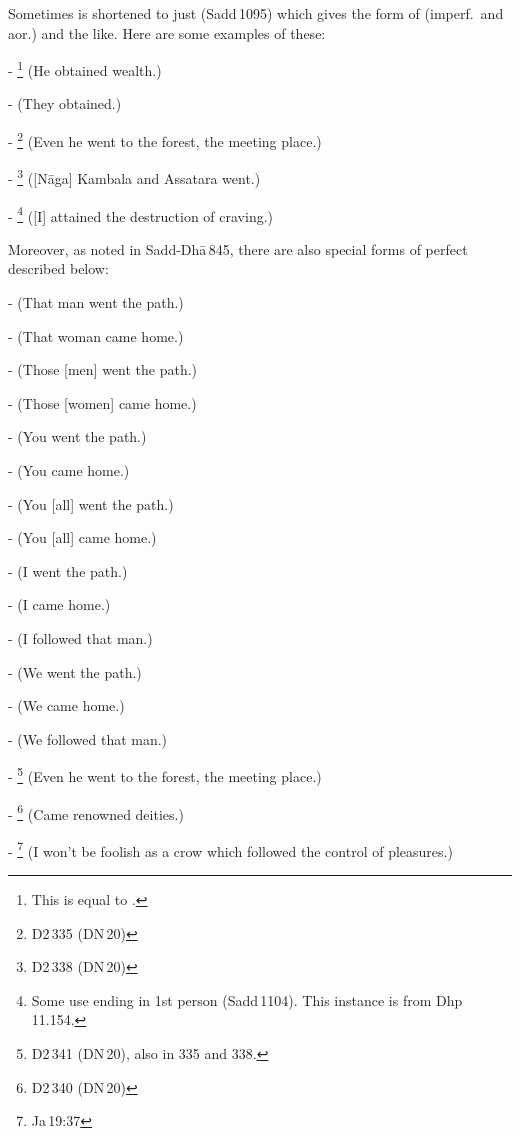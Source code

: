 Sometimes  is shortened to just  (Sadd\,1095) which gives the form of  (imperf.\ and aor.) and the like. Here are some examples of these:\par
- \footnote{This is equal to .} (He obtained wealth.)\par
-  (They obtained.)\par
- \footnote{D2\,335 (DN\,20)} (Even he went to the forest, the meeting place.)\par
- \footnote{D2\,338 (DN\,20)} ([N\=aga] Kambala and Assatara went.)\par
- \footnote{Some use  ending in 1st person (Sadd\,1104). This instance is from Dhp\,11.154.} ([I] attained the destruction of craving.)\par

Moreover, as noted in Sadd-Dh\=a\,845, there are also special forms of perfect  described below:

-  (That man went the path.)\par
-  (That woman came home.)\par
-  (Those [men] went the path.)\par
-  (Those [women] came home.)\par
-  (You went the path.)\par
-  (You came home.)\par
-  (You [all] went the path.)\par
-  (You [all] came home.)\par
-  (I went the path.)\par
-  (I came home.)\par
-  (I followed that man.)\par
-  (We went the path.)\par
-  (We came home.)\par
-  (We followed that man.)\par
- \footnote{D2\,341 (DN\,20), also  in 335 and 338.} (Even he went to the forest, the meeting place.)\par
- \footnote{D2\,340 (DN\,20)} (Came renowned deities.)\par
- \footnote{Ja\,19:37} (I won't be foolish as a crow which followed the control of pleasures.)\par

